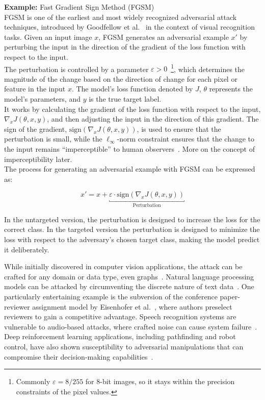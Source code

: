 \documentclass[a4paper, oneside]{discothesis}
\begin{document}
\begin{highlightbox}
	\textbf{Example:} Fast Gradient Sign Method (FGSM) \\

	FGSM is one of the earliest and most widely recognized adversarial attack techniques, introduced by Goodfellow et al.~\cite{goodfellow2014explaining} in the context of visual recognition tasks. Given an input image $x$, FGSM generates an adversarial example $x'$ by perturbing the input in the direction of the gradient of the loss function with respect to the input.\\

	The perturbation is controlled by a parameter $\varepsilon > 0$~\footnote{Commonly $\varepsilon = 8/255$ for 8-bit images, so it stays within the precision constraints of the pixel values.}, which determines the magnitude of the change based on the direction of change for each pixel or feature in the input $x$. The model's loss function denoted by $J$, $\theta$ represents the model's parameters, and $y$ is the true target label. \\
	
	It works by calculating the gradient of the loss function with respect to the input, $\nabla_x J(\theta, x, y)$, and then adjusting the input in the direction of this gradient. The sign of the gradient, $\text{sign}(\nabla_x J(\theta, x, y))$, is used to ensure that the perturbation is small, while the $\ell_\infty$-norm constraint ensures that the change to the input remains ``imperceptible'' to human observers~\cite{goodfellow2014explaining, zhang2019adversarial}. More on the concept of imperceptibility later.\\
	
	The process for generating an adversarial example with FGSM can be expressed as:
	
	$$x' = x + \underbracket{\varepsilon \cdot \text{sign}(\nabla_x J(\theta, x, y))}_{\text{Perturbation}}$$
	
	In the untargeted version, the perturbation is designed to increase the loss for the correct class. In the targeted version the perturbation is designed to minimize the loss with respect to the adversary's chosen target class, making the model predict it deliberately.
\end{highlightbox}

While initially discovered in computer vision applications, the attack can be crafted for any domain or data type, even graphs~\cite{Kashyap2024AdversarialAA}. Natural language processing models can be attacked by circumventing the discrete nature of text data~\cite{Han2022TextAA, meng2020geometry, yang2024assessing}. One particularly entertaining example is the subversion of the conference paper-reviewer assignment model by Eisenhofer et al.~\cite{eisenhofer2023no}, where authors preselect reviewers to gain a competitive advantage. Speech recognition systems are vulnerable to audio-based attacks, where crafted noise can cause system failure~\cite{rajaratnam2018noise}. Deep reinforcement learning applications, including pathfinding and robot control, have also shown susceptibility to adversarial manipulations that can compromise their decision-making capabilities~\cite{Bai2018AdversarialEC}.
\end{document}
